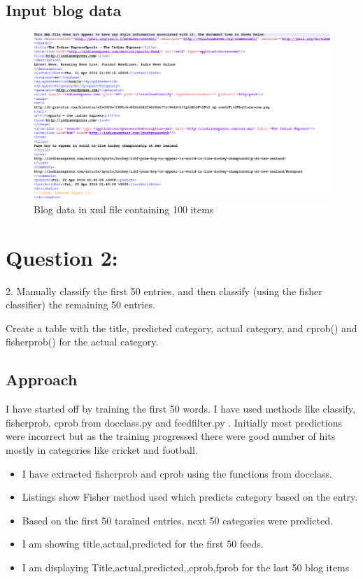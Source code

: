 \documentclass[12pt]{article}
\begin{document}
 \newpage




\subsection{Input blog data }
\begin{figure}[ht]
\includegraphics[scale=0.7]{../../q1/input.png}
\centering
\caption{Blog data in xml file containing 100 items}
\label{Removed edges}
\end{figure}


\newpage
\section{Question 2: }
2.  Manually classify the first 50 entries, and then classify (using
the fisher classifier) the remaining 50 entries. 

Create a table with the title, predicted category, actual category,
and cprob() and fisherprob() for the actual category.

\subsection{Approach}
I have started off by training the first 50 words. I have used methods like classify, fisherprob, cprob from docclass.py and feedfilter.py .
Initially most predictions were incorrect but as the training progressed there were good number of hits mostly in categories like cricket and football.

\begin{itemize}
\item I have extracted fisherprob and cprob using the functions  from docclass.
\item Listings show Fisher method used which predicts category based on the entry.
\item Based on the first 50 tarained entries, next 50 categories were predicted.
\item I am showing title,actual,predicted for the first 50 feeds.
\item I am displaying Title,actual,predicted,,cprob,fprob for the last 50 blog items
\end{itemize}
\end{document}
